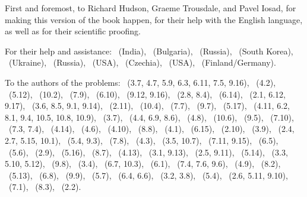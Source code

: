 \addchap{\lsAcknowledgementTitle}

First and foremost, to Richard Hudson, Graeme Trousdale, and Pavel Iosad, for making this version of the book happen, for their help with the English language, as well as for their scientific proofing.

For their help and assistance: \nameMChoudhury\ (India), 
\nameIDerzhanski\ (Bulgaria), 
\nameKGilyarova\ (Russia), 
\nameMKim\ (South Korea), 
\nameTKrashtan\ (Ukraine), 
\nameEMuravenko\ (Russia), 
\nameTPayne\ (USA), 
\nameJPetr\ (Czechia), 
\nameDRadev\ (USA), 
\nameKShagal\ (Finland/Germany).

\begin{sloppypar}
To the authors of the problems:
\namePArkadiev\ (3.7, 4.7, 5.9, 6.3, 6.11, 7.5, 9.16), 
\nameVBelikov\ (4.2), 
\nameABlackwell\ (5.12), 
\nameMBoron\ (10.2), 
\nameBBozhanov\ (7.9), 
\nameSBritova\ (6.10), 
\nameSBurlak\ (9.12, 9.16), 
\nameMChoudhury\ (2.8, 8.4), 
\nameTCucu\ (6.14), 
\nameIDerzhanski\ (2.1, 6.12, 9.17), 
\nameRDinca\ (3.6, 8.5, 9.1, 9.14), 
\nameSDmitrenko\ (2.11), 
\nameBDohnalova\ (10.4), 
\nameGDurnovo\ (7.7), 
\nameMFried\ (9.7), 
\nameRGandhi\ (5.17), 
\nameKGilyarova\ (4.11, 6.2, 8.1, 9.4, 10.5, 10.8, 10.9), 
\nameEGurevich\ (3.7), 
\namePHelmer\ (4.4, 6.9, 8.6), 
\nameJHenderson\ (4.8), 
\nameAHesterberg\ (10.6), 
\nameBHuang\ (9.5), 
\nameSCHuang\ (7.10), 
\nameRHudson\ (7.3, 7.4), 
\nameTKobayashi\ (4.14), 
\nameEKorovina\ (4.6), 
\nameTKrashtan\ (4.10), 
\nameAKretov\ (8.8), 
\nameAKukhto\ (4.1), 
\nameMLaznicka\ (6.15), 
\nameTHLee\ (2.10), 
\nameKLiang\ (3.9), 
\namePLittell\ (2.4, 2.7, 5.15, 10.1), 
\nameKLow\ (5.4, 9.3), 
\nameTMaisak\ (7.8), 
\nameTMcCoy\ (4.3), 
\nameDMirea\ (3.5, 10.7), 
\nameDMysak\ (7.11, 9.15), 
\nameHNewell\ (6.5), 
\nameVPapp\ (5.6), 
\nameGParti\ (2.9), 
\nameTPayne\ (5.16), 
\nameAPegusevs\ (8.7), 
\nameJPetr\ (4.13), 
\nameAPiperski\ (3.1, 9.13), 
\nameDRadev\ (2.5, 9.11),
\nameMRubinstein\ (5.14), 
\nameMSalter\ (3.3, 5.10, 5.12), 
\nameNSarda\ (9.8), 
\nameASemenuks\ (3.4), 
\nameCSheard\ (6.7, 10.3), 
\nameRSim\ (6.1), 
\nameHSomers\ (7.4, 7.6, 9.6), 
\nameASomin\ (4.9), 
\nameASouza\ (8.2), 
\nameSStrizhevskaya\ (5.13), 
\nameMSvatosova\ (6.8), 
\nameMSwan\ (9.9), 
\nameTTchervenkov\ (5.7), 
\nameYTestelets\ (6.4, 6.6), 
\nameSVaduguru\ (3.2, 3.8), 
\nameMVasev\ (5.4), 
\nameBNewsome\ (2.6, 5.11, 9.10), 
\nameAWade\ (7.1), 
\nameNZaika\ (8.3), 
\nameAZhurinsky\ (2.2).
\end{sloppypar}
